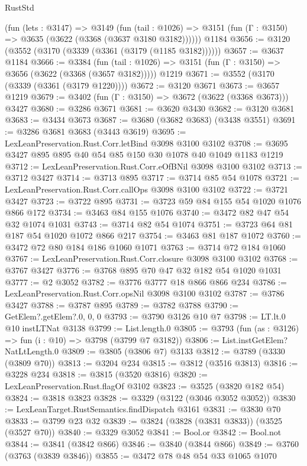 \begin{lexlean}{RustStd}
\begin{coremodule}
    (fun (lets : @3147) =>
    @3149
      (fun (tail : @1026) => @3151 (fun (Γ : @3150) => @3635 (@3622 (@3368 (@3637 @3180 @3182))))))
    @1184
@3656 := @3120 (@3552 (@3170 (@3339 (@3361 (@3179 (@1185 @3182))))))
@3657 := @3637 @1184
@3666 := @3384
    (fun (tail : @1026) => @3151 (fun (Γ : @3150) => @3656 (@3622 (@3368 (@3657 @3182)))))
    @1219
@3671 := @3552 (@3170 (@3339 (@3361 (@3179 @1220))))
@3672 := @3120 @3671
@3673 := @3657 @1219
@3679 := @3402 (fun (Γ : @3150) => @3672 (@3622 (@3368 @3673))) @3427
@3680 := @3286 @3671
@3681 := @3620 @3430
@3682 := @3120 @3681
@3683 := @3434 @3673
@3687 := @3680 (@3682 @3683) (@3438 @3551)
@3691 := @3286 @3681 @3683 (@3443 @3619)
@3695 := LexLeanPreservation.Rust.Corr.letBind @3098 @3100 @3102
@3708 := @3695 @3427 @895 @895 @40 @54 @85 @150 @30 @1078 @40 @1049 @1183 @1219
@3712 := LexLeanPreservation.Rust.Corr.eOfBNil @3098 @3100 @3102
@3713 := @3712 @3427
@3714 := @3713 @895
@3717 := @3714 @85 @54 @1078
@3721 := LexLeanPreservation.Rust.Corr.callOps @3098 @3100 @3102
@3722 := @3721 @3427
@3723 := @3722 @895
@3731 := @3723 @59 @84 @155 @54 @1020 @1076 @866 @172
@3734 := @3463 @84 @155 @1076
@3740 := @3472 @82 @47 @54 @32 @1074 @1031
@3743 := @3714 @82 @54 @1074
@3751 := @3723 @64 @81 @187 @54 @1020 @1072 @866 @217
@3754 := @3463 @81 @187 @1072
@3760 := @3472 @72 @80 @184 @186 @1060 @1071
@3763 := @3714 @72 @184 @1060
@3767 := LexLeanPreservation.Rust.Corr.closure @3098 @3100 @3102
@3768 := @3767 @3427
@3776 := @3768 @895 @70 @47 @32 @182 @54 @1020 @1031
@3777 := @2 @3052
@3782 := @3776 @3777 @18 @866 @866 @234
@3786 := LexLeanPreservation.Rust.Corr.opsNil @3098 @3100 @3102
@3787 := @3786 @3427
@3788 := @3787 @895
@3789 := @3782 @3788
@3790 := GetElem?.getElem?.{0, 0, 0}
@3793 := @3790 @3126 @10 @7
@3798 := LT.lt.{0} @10 instLTNat @3138
@3799 := List.length.{0}
@3805 := @3793 (fun (as : @3126) => fun (i : @10) => @3798 (@3799 @7 @3182))
@3806 := List.instGetElem?NatLtLength.{0}
@3809 := @3805 (@3806 @7) @3133
@3812 := @3789 (@3330 (@3809 @70))
@3813 := @3204 @234
@3815 := @3812 (@3516 @3813)
@3816 := @3228 @234
@3818 := @3815 (@3520 @3816)
@3820 := LexLeanPreservation.Rust.flagOf @3102
@3823 := @3525 (@3820 @182 @54)
@3824 := @3818 @3823
@3828 := @3329 (@3122 (@3046 @3052 @3052))
@3830 := LexLeanTarget.RustSemantics.findDispatch @3161
@3831 := @3830 @70
@3833 := @3799 @23 @32
@3839 := @3824 (@3828 (@3831 @3833)) (@3525 (@3527 @70))
@3840 := @3329 @3052
@3841 := Bool.or
@3842 := Bool.not
@3844 := @3841 (@3842 @866)
@3846 := @3840 (@3844 @866)
@3849 := @3760 (@3763 (@3839 @3846))
@3855 := @3472 @78 @48 @54 @33 @1065 @1070

\end{coremodule}
\end{lexlean}
